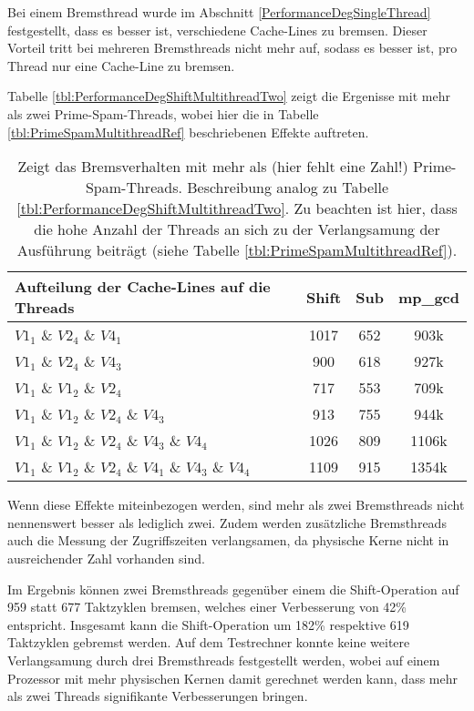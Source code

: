 Bei einem Bremsthread wurde im Abschnitt \ref{PerformanceDegSingleThread} festgestellt, dass es besser ist, verschiedene Cache-Lines zu bremsen.
Dieser Vorteil tritt bei mehreren Bremsthreads nicht mehr auf, sodass es besser ist, pro Thread nur eine Cache-Line zu bremsen.

Tabelle \ref{tbl:PerformanceDegShiftMultithreadTwo} zeigt die Ergenisse mit mehr als zwei Prime-Spam-Threads, wobei hier die in Tabelle \ref{tbl:PrimeSpamMultithreadRef} beschriebenen Effekte auftreten.

\begin{table}[h]
\caption{Zeigt das Bremsverhalten mit mehr als (hier fehlt eine Zahl!) Prime-Spam-Threads. Beschreibung analog zu Tabelle \ref{tbl:PerformanceDegShiftMultithreadTwo}. Zu beachten ist hier, dass die hohe Anzahl der Threads an sich zu der Verlangsamung der Ausführung beiträgt (siehe Tabelle \ref{tbl:PrimeSpamMultithreadRef}).}
\label{tbl:PerformanceDegShiftMultithreadThreePlus}
\begin{tabular}{lccc}
\toprule
Aufteilung der Cache-Lines auf die Threads & Shift & Sub & mp\_gcd \\
\midrule
$V1_1$ \& $V2_4$ \& $V4_1$                             & 1017  & 652 & 903k    \\
$V1_1$ \& $V2_4$ \& $V4_3$                            & 900   & 618 & 927k    \\
$V1_1$ \& $V1_2$ \& $V2_4$                             & 717   & 553 & 709k    \\
$V1_1$ \& $V1_2$ \& $V2_4$ \& $V4_3$                      & 913   & 755 & 944k    \\
$V1_1$ \& $V1_2$ \& $V2_4$ \& $V4_3$ \& $V4_4$               & 1026  & 809 & 1106k   \\
$V1_1$ \& $V1_2$ \& $V2_4$ \& $V4_1$ \& $V4_3$ \& $V4_4$         & 1109  & 915 & 1354k  \\
\bottomrule
\end{tabular}
\end{table}

Wenn diese Effekte miteinbezogen werden, sind mehr als zwei Bremsthreads nicht nennenswert besser als lediglich zwei.
Zudem werden zusätzliche Bremsthreads auch die Messung der Zugriffszeiten verlangsamen, da physische Kerne nicht in ausreichender Zahl vorhanden sind.

Im Ergebnis können zwei Bremsthreads gegenüber einem die Shift-Operation auf 959 statt 677 Taktzyklen bremsen, welches einer Verbesserung von 42\% entspricht.
Insgesamt kann die Shift-Operation um 182\% respektive 619 Taktzyklen gebremst werden.
Auf dem Testrechner konnte keine weitere Verlangsamung durch drei Bremsthreads festgestellt werden, wobei auf einem Prozessor mit mehr physischen Kernen damit gerechnet werden kann, dass mehr als zwei Threads signifikante Verbesserungen bringen.


